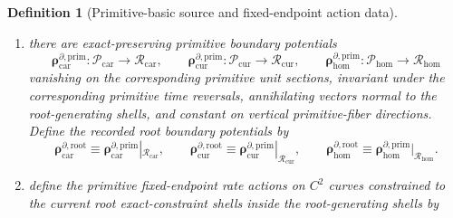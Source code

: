 \documentclass[11pt]{article}
\newcommand{\HomDensityClass}{\mathscr N_{\mathrm{hom}}}
\newcommand{\TensorFluxClass}{\mathscr J_{\mathrm{car}}}
\newcommand{\CurFluxClass}{\mathscr J_{\mathrm{cur}}}
\newcommand{\HomFluxClass}{\mathscr J_{\mathrm{hom}}}
\newcommand{\TensorPhaseReadClass}{\mathscr R_{\mathrm{car}}}
\newcommand{\CurPhaseReadClass}{\mathscr R_{\mathrm{cur}}}
\newcommand{\HomPhaseReadClass}{\mathscr R_{\mathrm{hom}}}
\newcommand{\TensorRootSpace}{\mathcal R_{\mathrm{car}}}
\newcommand{\CurRootSpace}{\mathcal R_{\mathrm{cur}}}
\newcommand{\HomRootSpace}{\mathcal R_{\mathrm{hom}}}
\newcommand{\TensorRootDensitySource}{\boldsymbol{q}_{\mathrm{car}}^{\mathrm{root}}}
\newcommand{\CurRootDensitySource}{\boldsymbol{q}_{\mathrm{cur}}^{\mathrm{root}}}
\newcommand{\HomRootDensitySource}{\boldsymbol{q}_{\mathrm{hom}}^{\mathrm{root}}}
\newcommand{\TensorRootFluxSource}{\boldsymbol{j}_{\mathrm{car}}^{\mathrm{root}}}
\newcommand{\CurRootFluxSource}{\boldsymbol{j}_{\mathrm{cur}}^{\mathrm{root}}}
\newcommand{\HomRootFluxSource}{\boldsymbol{j}_{\mathrm{hom}}^{\mathrm{root}}}
\newcommand{\TensorRootBoundarySource}{\boldsymbol{\rho}_{\mathrm{car}}^{\partial,\mathrm{root}}}
\newcommand{\CurRootBoundarySource}{\boldsymbol{\rho}_{\mathrm{cur}}^{\partial,\mathrm{root}}}
\newcommand{\HomRootBoundarySource}{\boldsymbol{\rho}_{\mathrm{hom}}^{\partial,\mathrm{root}}}
\newcommand{\TensorPrimitiveSpace}{\mathcal P_{\mathrm{car}}}
\newcommand{\CurPrimitiveSpace}{\mathcal P_{\mathrm{cur}}}
\newcommand{\HomPrimitiveSpace}{\mathcal P_{\mathrm{hom}}}
\newcommand{\TensorPrimitiveDensitySource}{\boldsymbol{q}_{\mathrm{car}}^{\mathrm{prim}}}
\newcommand{\CurPrimitiveDensitySource}{\boldsymbol{q}_{\mathrm{cur}}^{\mathrm{prim}}}
\newcommand{\HomPrimitiveDensitySource}{\boldsymbol{q}_{\mathrm{hom}}^{\mathrm{prim}}}
\newcommand{\TensorPrimitiveFluxSource}{\boldsymbol{j}_{\mathrm{car}}^{\mathrm{prim}}}
\newcommand{\CurPrimitiveFluxSource}{\boldsymbol{j}_{\mathrm{cur}}^{\mathrm{prim}}}
\newcommand{\HomPrimitiveFluxSource}{\boldsymbol{j}_{\mathrm{hom}}^{\mathrm{prim}}}
\newcommand{\TensorPrimitiveBoundarySource}{\boldsymbol{\rho}_{\mathrm{car}}^{\partial,\mathrm{prim}}}
\newcommand{\CurPrimitiveBoundarySource}{\boldsymbol{\rho}_{\mathrm{cur}}^{\partial,\mathrm{prim}}}
\newcommand{\HomPrimitiveBoundarySource}{\boldsymbol{\rho}_{\mathrm{hom}}^{\partial,\mathrm{prim}}}
\newtheorem{definition}{Definition}
\begin{document}
\begin{definition}[Primitive-basic source and fixed-endpoint action data]
\begin{enumerate}
\[    \HomPrimitiveDensitySource:\HomPrimitiveSpace\to\HomDensityClass,
    \]
    \[
    \TensorPrimitiveFluxSource:\TensorPrimitiveSpace\to\TensorFluxClass,\qquad
    \CurPrimitiveFluxSource:\CurPrimitiveSpace\to\CurFluxClass,\qquad
    \HomPrimitiveFluxSource:\HomPrimitiveSpace\to\HomFluxClass,
    \]
    invariant under the corresponding primitive time reversals, preserved along the current root characteristic curves, and constant on root-shell-normal directions and on vertical primitive-fiber directions. Define the recorded root density and root flux source fields by restriction:
    \begin{equation}
    \TensorRootDensitySource\equiv\TensorPrimitiveDensitySource|_{\TensorRootSpace},\qquad
    \CurRootDensitySource\equiv\CurPrimitiveDensitySource|_{\CurRootSpace},\qquad
    \HomRootDensitySource\equiv\HomPrimitiveDensitySource|_{\HomRootSpace},
    \label{eq:root_density_from_primitive}
    \end{equation}
    \begin{equation}
    \TensorRootFluxSource\equiv\TensorPrimitiveFluxSource|_{\TensorRootSpace},\qquad
    \CurRootFluxSource\equiv\CurPrimitiveFluxSource|_{\CurRootSpace},\qquad
    \HomRootFluxSource\equiv\HomPrimitiveFluxSource|_{\HomRootSpace}.
    \label{eq:root_flux_from_primitive}
    \end{equation}
    \item there are exact-preserving primitive boundary potentials
    \[
    \TensorPrimitiveBoundarySource:\TensorPrimitiveSpace\to\TensorPhaseReadClass,\qquad
    \CurPrimitiveBoundarySource:\CurPrimitiveSpace\to\CurPhaseReadClass,\qquad
    \HomPrimitiveBoundarySource:\HomPrimitiveSpace\to\HomPhaseReadClass
    \]
    vanishing on the corresponding primitive unit sections, invariant under the corresponding primitive time reversals, annihilating vectors normal to the root-generating shells, and constant on vertical primitive-fiber directions. Define the recorded root boundary potentials by
    \begin{equation}
    \TensorRootBoundarySource\equiv\TensorPrimitiveBoundarySource|_{\TensorRootSpace},\qquad
    \CurRootBoundarySource\equiv\CurPrimitiveBoundarySource|_{\CurRootSpace},\qquad
    \HomRootBoundarySource\equiv\HomPrimitiveBoundarySource|_{\HomRootSpace}.
    \label{eq:root_boundary_from_primitive}
    \end{equation}
    \item define the primitive fixed-endpoint rate actions on \(C^2\) curves constrained to the current root exact-constraint shells inside the root-generating shells by

\end{enumerate}
\end{definition}
\end{document}
